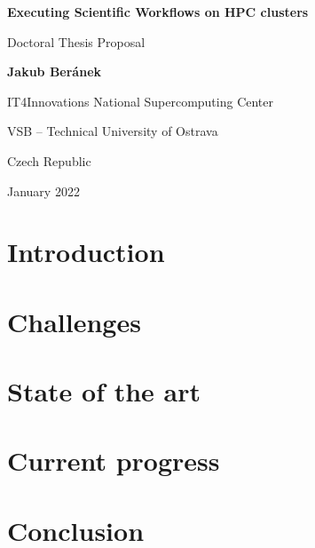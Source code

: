 \documentclass[11pt]{article}
\begin{document}
\begin{titlepage}
    \begin{center}
        \vspace*{1cm}
        \par
        \Huge
        \textbf{Executing Scientific Workflows on HPC clusters}
        \par
        \vspace{0.5cm}
        \LARGE
        Doctoral Thesis Proposal
        \par
        \vspace{1.5cm}
        \par
        \textbf{Jakub Beránek}
        \par
        \vspace{9.cm}
        \par
        {
            \Large
            IT4Innovations National Supercomputing Center\par
            VSB -- Technical University of Ostrava\par
            Czech Republic\par
            January 2022
        }
    \end{center}
\end{titlepage}

\tableofcontents
\clearpage

\section{Introduction}
\label{sec:introduction}


\section{Challenges}
\label{sec:challenges}


\section{State of the art}
\label{sec:state_of_the_art}


\section{Current progress}
\label{sec:current_progress}


\section{Conclusion}
\label{sec:conclusion}
\end{document}
